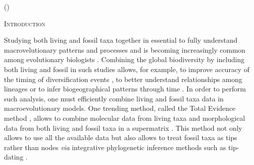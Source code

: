 \documentclass[12pt,letterpaper]{article}
\renewcommand{\section}[1]{%
\bigskip
\begin{center}
\begin{Large}
\normalfont\scshape #1
\medskip
\end{Large}
\end{center}}
\begin{document}
\noindent ()\\

\vspace{1.5in}

\newpage 

%
%

\section{Introduction}
Studying both living and fossil taxa together in essential to fully understand macrovelutionary patterns and processes and is becoming increasingly common among evolutionary biologists \citep{jacksonwhat2006,quentaldiversity2010,dietlconservation2011,slaterunifying2013,fritzdiversity2013,Wood01032013}.
Combining the global biodiversity by including both living and fossil in such studies allows, for example, to improve accuracy of the timing of diversification events \citep[e.g.][]{ronquista2012}, to better understand relationships among lineages \citep[e.g.][]{beckancient2014} or to infer biogeographical patterns through time \citep[e.g.][]{Meseguer01032015}.
In order to perform such analysis, one must efficiently combine living and fossil taxa data in macroevolutionary models.
One trending method, called the Total Evidence method \citep{eernissetaxonomic1993,ronquista2012}, allows to combine molecular data from living taxa and morphological data from both living and fossil taxa in a supermatrix \citep[e.g.][]{pyrondivergence2011,ronquista2012,schragocombining2013,slaterunifying2013,beckancient2014,Meseguer01032015}.
This method not only allows to use all the available data but also allows to treat fossil taxa as tips rather than nodes \textit{via} integrative phylogenetic inference methods such as tip-dating \citep{ronquista2012,Drummond01082012,Wood01032013,BEASTmaster}.
\end{document}
